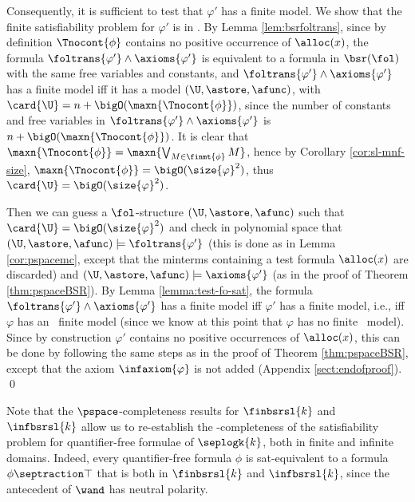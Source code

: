 Consequently, it is sufficient to test that $\varphi'$ has a finite
model.
\ifLongVersion
We show that the finite satisfiability problem for $\varphi'$ is
in \pspace. By Lemma \ref{lem:bsrfoltrans}, since by definition
$\Tnocont{\phi}$ contains no positive occurrence of $\alloc(x)$, the
formula $\foltrans{\varphi'} \wedge \axioms{\varphi'}$ is equivalent
to a formula in $\bsr(\fol)$ with the same free variables and
constants, and $\foltrans{\varphi'} \wedge \axioms{\varphi'}$ has a
finite model iff it has a model $(\U,\astore,\afunc)$, with $\card{\U}
= n+\bigO(\maxn{\Tnocont{\phi}})$, since the number of constants and
free variables in $\foltrans{\varphi'} \wedge \axioms{\varphi'}$ is
$n+\bigO(\maxn{\Tnocont{\phi}})$.  It is clear that
$\maxn{\Tnocont{\phi}} = \maxn{\bigvee_{M \in \finmt{\phi}} M}$, hence
by Corollary \ref{cor:sl-mnf-size},
$\maxn{\Tnocont{\phi}}=\bigO(\size{\varphi}^2)$, thus $\card{\U} =
\bigO(\size{\varphi}^2)$.
  
Then we can guess a $\fol$-structure $(\U,\astore,\afunc)$ such that
$\card{\U} = \bigO(\size{\varphi}^2)$ and check in polynomial space
that $(\U,\astore,\afunc) \models \foltrans{\varphi'}$ (this is done
as in Lemma \ref{cor:pspacemc}, except that the minterms containing a
test formula $\alloc(x)$ are discarded) and $(\U,\astore,\afunc)
\models \axioms{\varphi'}$ (as in the proof of Theorem
\ref{thm:pspaceBSR}).  By Lemma \ref{lemma:test-fo-sat}, the formula
$\foltrans{\varphi'} \wedge \axioms{\varphi'}$ has a finite model iff
$\varphi'$ has a finite model, i.e., iff $\varphi$ has an
\ncontrolled\ finite model (since we know at this point that $\varphi$
has no finite \controlled\ model).
\else
Since by construction $\varphi'$ contains no positive occurrences of
$\alloc(x)$, this can be done by following the same steps as in the
proof of Theorem \ref{thm:pspaceBSR}, except that the axiom
$\infaxiom{\varphi}$ is not added (Appendix \ref{sect:endofproof}).
\fi
\qed

Note that the $\pspace$-completeness results for $\finbsrsl{k}$ and
$\infbsrsl{k}$ allow us to re-establish the \pspace-completeness of
the satisfiability problem for quantifier-free formulae of
$\seplogk{k}$, both in finite and infinite domains.  Indeed, every
quantifier-free formula $\phi$ is sat-equivalent to a formula $\phi
\septraction \top$ that is both in $\finbsrsl{k}$ and $\infbsrsl{k}$,
since the antecedent of $\wand$ has neutral polarity.

